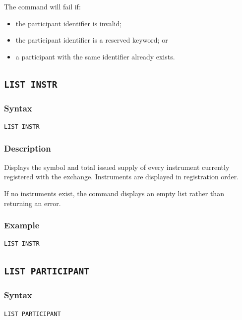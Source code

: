 \documentclass{article}
\begin{document}
The command will fail if:

\begin{itemize}
    \item the participant identifier is invalid;
    \item the participant identifier is a reserved keyword; or
    \item a participant with the same identifier already exists.
\end{itemize}

\subsection{\texttt{LIST INSTR}}

\subsubsection*{Syntax}

\begin{lstlisting}
LIST INSTR
\end{lstlisting}

\subsubsection*{Description}

Displays the symbol and total issued supply of every instrument currently
registered with the exchange. Instruments are displayed in registration
order.

If no instruments exist, the command displays an empty list rather than
returning an error.

\subsubsection*{Example}

\begin{lstlisting}
LIST INSTR
\end{lstlisting}

\subsection{\texttt{LIST PARTICIPANT}}

\subsubsection*{Syntax}

\begin{lstlisting}
LIST PARTICIPANT
\end{lstlisting}
\end{document}
